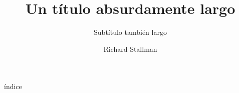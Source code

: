 \documentclass{beamer}
\title[Título corto]{Un título absurdamente largo}
\subtitle[Subtítulo corto]{Subtítulo también largo}
\author[iGNUcio]{Richard Stallman}
\begin{document}
  \begin{frame}
    \titlepage %
  \end{frame}

  \begin{frame}{índice}
    \tableofcontents
  \end{frame}
\end{document}
